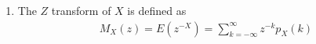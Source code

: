 \documentclass[journal,12pt,onecolumn]{IEEEtran}
\providecommand{\brak}[1]{\ensuremath{\left(#1\right)}}
\theoremstyle{remark}
\newcommand{\myvec}[1]{\ensuremath{\begin{pmatrix}#1\end{pmatrix}}}
\numberwithin{equation}{section}
\let\vec\mathbf
\begin{document}
\begin{enumerate}
\item The $Z$ transform of $X$ is defined as 
	\begin{align}
	M_X(z)=E\brak{z^{-X}} = \sum_{k = -\infty}^{\infty}z^{-k}p_X(k)
	\end{align}
\end{enumerate}
\end{document}
